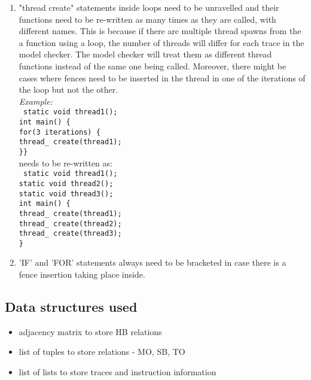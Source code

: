 \begin{enumerate}
	\item "thread create" statements inside loops need to be unravelled and their functions need to be re-written as many times as they are called, with different names. This is because if there are multiple thread spawns from the a function using a loop, the number of threads will differ for each trace in the model checker. The model checker will treat them as different thread functions instead of the same one being called. Moreover, there might be cases where fences need to be inserted in the thread in one of the iterations of the loop but not the other.\\
	\textit{Example:}\\ \texttt{%
	static void thread1();\\
	int main() \{\\
	\hspace{10mm} for(3 iterations) \{\\
	thread\_ create(thread1);\\
	\}\}%
	}\\ needs to be re-written as:\\
	\texttt{%
	static void thread1();\\
	static void thread2();\\
	static void thread3();\\
	int main() \{\\
	thread\_ create(thread1);\\
	thread\_ create(thread2);\\
	thread\_ create(thread3);\\
	\}%
	}
	
	\item 'IF' and 'FOR' statements always need to be bracketed in case there is a fence insertion taking place inside.
\end{enumerate}

\subsection{Data structures used}
\begin{itemize}
	\item adjacency matrix to store HB relations
	\item list of tuples to store relations - MO, SB, TO
	\item list of lists to store traces and instruction information
\end{itemize}


